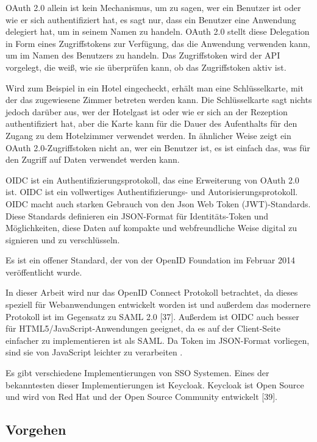 OAuth 2.0 allein ist kein Mechanismus, um zu sagen, wer ein Benutzer ist oder wie er sich authentifiziert hat, es sagt nur, dass ein Benutzer eine Anwendung delegiert hat, um in seinem Namen zu handeln. OAuth 2.0 stellt diese Delegation in Form eines Zugriffstokens zur Verfügung, das die Anwendung verwenden kann, um im Namen des Benutzers zu handeln. Das Zugriffstoken wird der API vorgelegt, die weiß, wie sie überprüfen kann, ob das Zugriffstoken aktiv ist. \cite{AuthorizationvsAuthentication}

Wird zum Beispiel in ein Hotel eingecheckt, erhält man eine Schlüsselkarte, mit der das zugewiesene Zimmer betreten werden kann. Die Schlüsselkarte sagt nichts jedoch darüber aus, wer der Hotelgast ist oder wie er sich an der Rezeption authentifiziert hat, aber die Karte kann für die Dauer des Aufenthalts für den Zugang zu dem Hotelzimmer verwendet werden. In ähnlicher Weise zeigt ein OAuth 2.0-Zugriffstoken nicht an, wer ein Benutzer ist, es ist einfach das, was für den Zugriff auf Daten verwendet werden kann. \cite{AuthorizationvsAuthentication}

OIDC ist ein Authentifizierungsprotokoll, das eine Erweiterung von OAuth 2.0 ist. OIDC ist ein vollwertiges Authentifizierungs- und Autorisierungsprotokoll. OIDC macht auch starken Gebrauch von den Json Web Token (JWT)-Standards. Diese Standards definieren ein JSON-Format für Identitäts-Token und Möglichkeiten, diese Daten auf kompakte und webfreundliche Weise digital zu signieren und zu verschlüsseln. \cite{ssoProtocols}

Es ist ein offener Standard, der von der OpenID Foundation im Februar 2014 veröffentlicht wurde. \cite{OAuth2inAction}

In dieser Arbeit wird nur das OpenID Connect Protokoll betrachtet, da dieses speziell für Webanwendungen entwickelt worden ist und außerdem das modernere Protokoll ist im Gegensatz zu SAML 2.0 [37]. Außerdem ist OIDC auch besser für HTML5/JavaScript-Anwendungen geeignet, da es auf der Client-Seite einfacher zu implementieren ist als SAML. Da Token im JSON-Format vorliegen, sind sie von JavaScript leichter zu verarbeiten \cite{ssoProtocols}.

Es gibt verschiedene Implementierungen von SSO Systemen. Eines der bekanntesten dieser Implementierungen ist Keycloak. Keycloak ist Open Source und wird von Red Hat und der Open Source Community entwickelt [39].


\subsection{Vorgehen}

